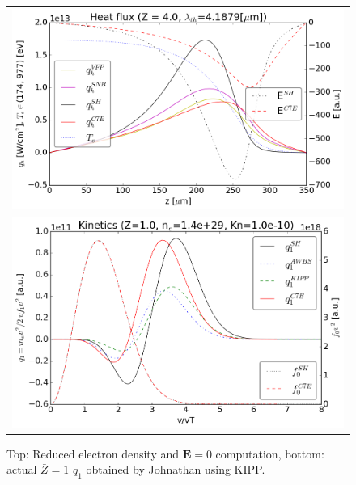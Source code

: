 \documentclass[preprint,12pt]{elsarticle}
\newcommand{\vect}[1]{\boldsymbol{#1}}
\newcommand{\Zbar}{\bar{Z}}
\newcommand{\E}{\vect{E}}
\begin{document}
\begin{figure}[tbh]
  \begin{center}
    \begin{tabular}{c}
      \includegraphics[width=1.0\textwidth]{../VFPdata/C7_heatflux_Emimic_12ps.png} \\
      \includegraphics[width=1.0\textwidth]{../VFPdata/KIPPkinetics.png}
    \end{tabular}
  \caption{Top: Reduced electron density and $\E=0$ computation, bottom: actual $\Zbar=1$ $q_1$ obtained by Johnathan using KIPP.
  }
  \end{center}
  \label{fig:AWBScorrection_f1}
\end{figure}
\end{document}
